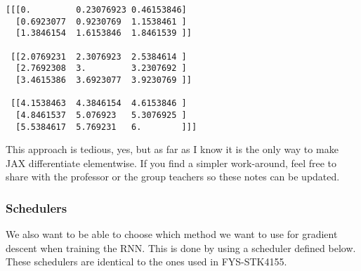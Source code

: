 \documentclass[11pt]{article}
\begin{document}
    \begin{Verbatim}[commandchars=\\\{\}]
[[[0.         0.23076923 0.46153846]
  [0.6923077  0.9230769  1.1538461 ]
  [1.3846154  1.6153846  1.8461539 ]]

 [[2.0769231  2.3076923  2.5384614 ]
  [2.7692308  3.         3.2307692 ]
  [3.4615386  3.6923077  3.9230769 ]]

 [[4.1538463  4.3846154  4.6153846 ]
  [4.8461537  5.076923   5.3076925 ]
  [5.5384617  5.769231   6.        ]]]
    \end{Verbatim}

    This approach is tedious, yes, but as far as I know it is the only way
to make JAX differentiate elementwise. If you find a simpler
work-around, feel free to share with the professor or the group teachers
so these notes can be updated.

    \subsubsection{Schedulers}\label{schedulers}

    We also want to be able to choose which method we want to use for
gradient descent when training the RNN. This is done by using a
scheduler defined below. These schedulers are identical to the ones used
in FYS-STK4155.
\end{document}

